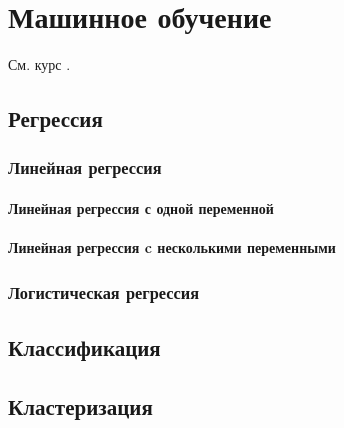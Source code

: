 \chapter{Машинное обучение}

См. курс \cite{c:m-l}.
\section{Регрессия}
\subsection{Линейная регрессия}
\subsubsection{Линейная регрессия с одной переменной}
\subsubsection{Линейная регрессия c несколькими переменными}
\subsection{Логистическая регрессия}
\section{Классификация}
\section{Кластеризация}
